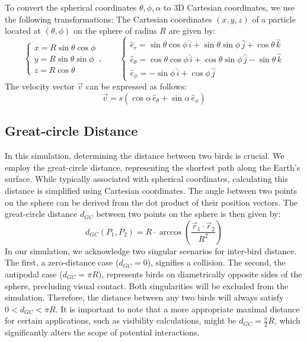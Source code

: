 \documentclass[12pt,a4paper]{article}
\begin{document}
To convert the spherical coordinates \(\theta, \phi, \alpha\) to 3D Cartesian coordinates, we use the following transformations:
The Cartesian coordinates \((x, y, z)\) of a particle located at \((\theta, \phi)\) on the sphere of radius \(R\) are given by:
\begin{equation}
    \label{eq-spherical_to_cartesian}
\left\{
\begin{array}{l}
x = R \sin\theta \cos\phi \\
y = R \sin\theta \sin\phi \\
z = R \cos\theta
\end{array}
\right. , \qquad
\left\{
\begin{array}{l}
\hat{e}_r = \sin\theta \cos\phi \, \hat{i} + \sin\theta \sin\phi \, \hat{j} + \cos\theta \, \hat{k} \\
\hat{e}_\theta = \cos\theta \cos\phi \, \hat{i} + \cos\theta \sin\phi \, \hat{j} - \sin\theta \, \hat{k} \\
\hat{e}_\phi = -\sin\phi \, \hat{i} + \cos\phi \, \hat{j}
\end{array}
\right.
\end{equation}
The velocity vector \(\vec{v}\) can be expressed as follows:
\begin{equation}
    \label{eq-velocity_vector}
    \vec{v} = s \left( \cos\alpha \, \hat{e}_\theta + \sin\alpha \, \hat{e}_\phi \right)
\end{equation}
\subsection{Great-circle Distance}
In this simulation, determining the distance between two birds is crucial. We employ the great-circle distance, representing the shortest path along the Earth's surface. While typically associated with spherical coordinates, calculating this distance is simplified using Cartesian coordinates. The angle between two points on the sphere can be derived from the dot product of their position vectors. The great-circle distance \(d_{GC}\) between two points on the sphere is then given by:
\begin{equation}
    \label{eq-great_circle_distance}
    d_{GC}\left(P_1, P_2\right) = R \cdot \arccos\left( \frac{\vec{r}_1 \cdot \vec{r}_2}{R^2} \right)
\end{equation}
In our simulation, we acknowledge two singular scenarios for inter-bird distance. The first, a zero-distance case (\(d_{GC} = 0\)), signifies a collision. The second, the antipodal case (\(d_{GC} = \pi R\)), represents birds on diametrically opposite sides of the sphere, precluding visual contact. Both singularities will be excluded from the simulation. Therefore, the distance between any two birds will always satisfy \(0 < d_{GC} < \pi R\). It is important to note that a more appropriate maximal distance for certain applications, such as visibility calculations, might be \(d_{GC} = \frac{\pi}{2} R\), which significantly alters the scope of potential interactions.
\end{document}
